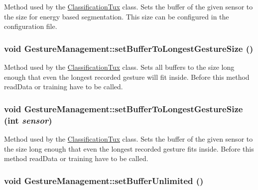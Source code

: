 \label{classGestureManagement_aceff487c58b7a4e7a837b75207d6cf6e}
Method used by the \hyperlink{classClassificationTux}{ClassificationTux} class. Sets the buffer of the given sensor to the size for energy based segmentation. This size can be configured in the configuration file. \hypertarget{classGestureManagement_a05cef685ea73cd6ec086c8f98a26cc66}{
\subsubsection[{setBufferToLongestGestureSize}]{\setlength{\rightskip}{0pt plus 5cm}void GestureManagement::setBufferToLongestGestureSize ()}}
\label{classGestureManagement_a05cef685ea73cd6ec086c8f98a26cc66}
Method used by the \hyperlink{classClassificationTux}{ClassificationTux} class. Sets all buffers to the size long enough that even the longest recorded gesture will fit inside. Before this method readData or training have to be called. \hypertarget{classGestureManagement_a3b2b18a390a23ea7a3e355d339945242}{
\subsubsection[{setBufferToLongestGestureSize}]{\setlength{\rightskip}{0pt plus 5cm}void GestureManagement::setBufferToLongestGestureSize (int {\em sensor})}}
\label{classGestureManagement_a3b2b18a390a23ea7a3e355d339945242}
Method used by the \hyperlink{classClassificationTux}{ClassificationTux} class. Sets the buffer of the given sensor to the size long enough that even the longest recorded gesture fits inside. Before this method readData or training have to be called. \hypertarget{classGestureManagement_af9bbed6b1b9f4dca4923abbe86aab41b}{
\subsubsection[{setBufferUnlimited}]{\setlength{\rightskip}{0pt plus 5cm}void GestureManagement::setBufferUnlimited ()}}
